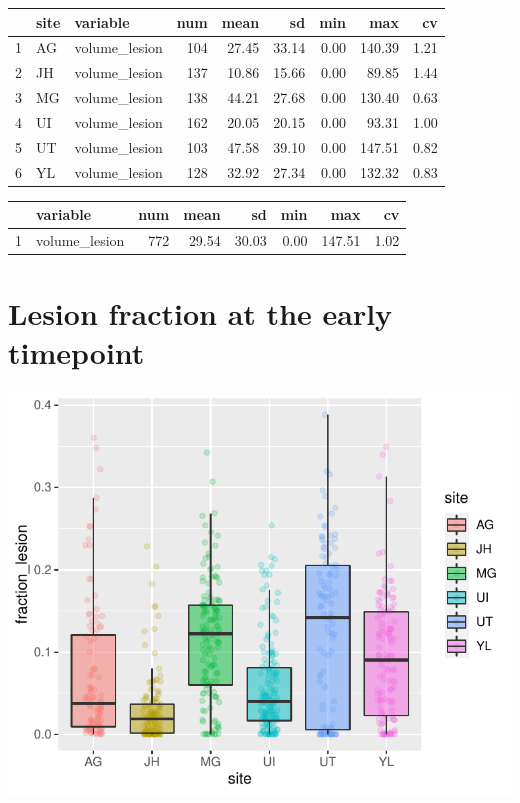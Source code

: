 \documentclass[
]{article}
\begin{document}
\begin{table}[ht]
\centering
\begin{tabular}{rllrrrrrr}
  \hline
 & site & variable & num & mean & sd & min & max & cv \\ 
  \hline
1 & AG & volume\_lesion & 104 & 27.45 & 33.14 & 0.00 & 140.39 & 1.21 \\ 
  2 & JH & volume\_lesion & 137 & 10.86 & 15.66 & 0.00 & 89.85 & 1.44 \\ 
  3 & MG & volume\_lesion & 138 & 44.21 & 27.68 & 0.00 & 130.40 & 0.63 \\ 
  4 & UI & volume\_lesion & 162 & 20.05 & 20.15 & 0.00 & 93.31 & 1.00 \\ 
  5 & UT & volume\_lesion & 103 & 47.58 & 39.10 & 0.00 & 147.51 & 0.82 \\ 
  6 & YL & volume\_lesion & 128 & 32.92 & 27.34 & 0.00 & 132.32 & 0.83 \\ 
   \hline
\end{tabular}
\end{table}
\begin{table}[ht]
\centering
\begin{tabular}{rlrrrrrr}
  \hline
 & variable & num & mean & sd & min & max & cv \\ 
  \hline
1 & volume\_lesion & 772 & 29.54 & 30.03 & 0.00 & 147.51 & 1.02 \\ 
   \hline
\end{tabular}
\end{table}

\hypertarget{lesion-fraction-at-the-early-timepoint}{%
\section{Lesion fraction at the early
timepoint}\label{lesion-fraction-at-the-early-timepoint}}

\begin{center}\includegraphics{paper_files/figure-latex/plot_fraction_lesion_early-1} \end{center}
\end{document}
